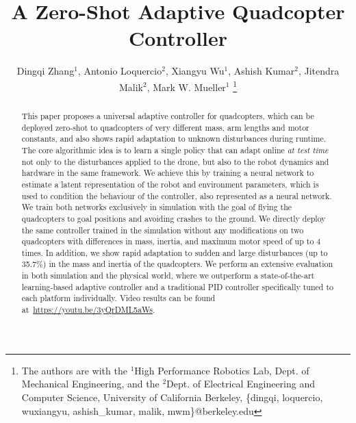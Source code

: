\documentclass[letterpaper, 10 pt, conference]{ieeeconf}  %
\title{\LARGE \bf
A Zero-Shot Adaptive Quadcopter Controller
}
\author{Dingqi Zhang$^1$, Antonio Loquercio$^2$, Xiangyu Wu$^1$, Ashish Kumar$^2$, Jitendra Malik$^2$, Mark W. Mueller$^1$%
\thanks{The authors are with the $^1$High Performance Robotics Lab, Dept. of Mechanical Engineering, and the $^2$Dept. of Electrical Engineering and Computer Science, University of California Berkeley, \{dingqi, loquercio, wuxiangyu, ashish\_kumar, malik, mwm\}@berkeley.edu} 
}
\newcommand{\todo}[1]{\textcolor{red}{TODO: #1}}
\begin{document}
\maketitle
\maketitle
\thispagestyle{empty}
\pagestyle{empty}






\begin{abstract}

This paper proposes a universal adaptive controller for quadcopters, which can be deployed zero-shot to quadcopters of very different mass, arm lengths and motor constants, and also shows rapid adaptation to unknown disturbances during runtime. The core algorithmic idea is to learn a single policy that can adapt online \emph{at test time} not only to the disturbances applied to the drone, but also to the robot dynamics and hardware in the same framework.
We achieve this by training a neural network to estimate a latent representation of the robot and environment parameters, which is used to condition the behaviour of the controller, also represented as a neural network. We train both networks exclusively in simulation with the goal of flying the quadcopters to goal positions and avoiding crashes to the ground. We directly deploy the same controller trained in the simulation without any modifications on two quadcopters with differences in mass, inertia, and maximum motor speed of up to 4 times. In addition, we show rapid adaptation to sudden and large disturbances (up to 35.7\%) in the mass and inertia of the quadcopters. We perform an extensive evaluation in both simulation and the physical world, where we outperform a state-of-the-art learning-based adaptive controller and a traditional PID controller specifically tuned to each platform individually. Video results can be found at~\url{https://youtu.be/3yQrDML5aWs}. %

\end{abstract}
\end{document}
